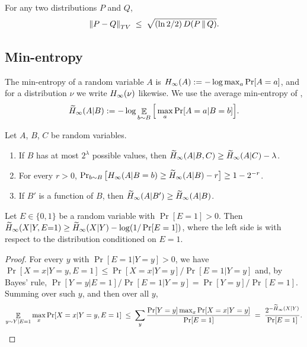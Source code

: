 \begin{fact}\label{fact:pinsker}
For any two distributions $P$ and $Q$,
\[ \left\lVert P - Q\right\rVert_{TV} \;\le\; \sqrt{(\ln 2/2)\, D(P \,\|\, Q)}. \]
\end{fact}

\subsection{Min-entropy}\label{sec:prelim-minent}

The min-entropy of a random variable $A$ is $H_\infty(A) := -\log \max_a \Pr[A = a]$, and for a distribution $\nu$ we write $H_\infty(\nu)$ likewise. We use the average min-entropy of \cite{dodis_fuzzy_2008},
\[ \widetilde{H}_\infty(A | B) := -\log \mathop{\mathbb{E}}_{b \sim B}\Big[\max_a \Pr[A = a | B = b]\Big]. \]

\begin{fact}\label{fact:avg-minent}
Let $A$, $B$, $C$ be random variables.
\begin{enumerate}[label=(\alph*)]
  \item If $B$ has at most $2^\lambda$ possible values, then $\widetilde{H}_\infty(A | B, C) \ge \widetilde{H}_\infty(A | C) - \lambda$.
  \item For every $r > 0$, $\Pr_{b \sim B}\big[H_\infty(A | B = b) \ge \widetilde{H}_\infty(A | B) - r\big] \ge 1 - 2^{-r}$.
  \item If $B'$ is a function of $B$, then $\widetilde{H}_\infty(A | B') \ge \widetilde{H}_\infty(A | B)$.
\end{enumerate}
\end{fact}

\begin{fact}\label{fact:event}
Let $E \in \{0,1\}$ be a random variable with $\Pr[E = 1] > 0$. Then $\widetilde{H}_\infty(X | Y, E {=} 1) \ge \widetilde{H}_\infty(X | Y) - \log(1/\Pr[E = 1])$, where the left side is with respect to the distribution conditioned on $E = 1$.
\end{fact}
\begin{proof}
For every $y$ with $\Pr[E = 1 | Y = y] > 0$, we have $\Pr[X = x | Y = y, E = 1] \le \Pr[X = x | Y = y]/\Pr[E = 1 | Y = y]$ and, by Bayes' rule, $\Pr[Y = y | E = 1]/\Pr[E = 1 | Y = y] = \Pr[Y = y]/\Pr[E = 1]$. Summing over such $y$, and then over all $y$,
\[ \mathop{\mathbb{E}}_{y \sim Y | E = 1} \max_x \Pr[X = x | Y = y, E = 1] \;\le\; \sum_{y} \frac{\Pr[Y = y] \max_x \Pr[X = x | Y = y]}{\Pr[E = 1]} \;=\; \frac{2^{-\widetilde{H}_\infty(X | Y)}}{\Pr[E = 1]}. \qedhere \]
\end{proof}

